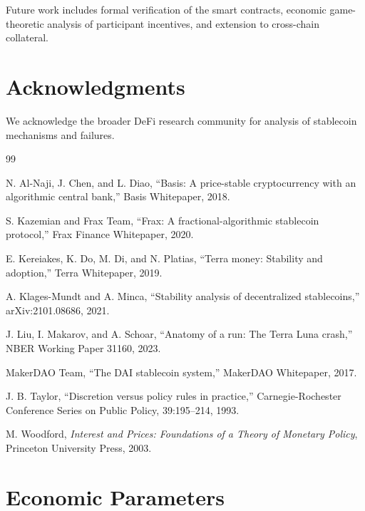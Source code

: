\documentclass[11pt,a4paper]{article}
\begin{document}
Future work includes formal verification of the smart contracts, economic game-theoretic analysis of participant incentives, and extension to cross-chain collateral.

\section*{Acknowledgments}

We acknowledge the broader DeFi research community for analysis of stablecoin mechanisms and failures.


\begin{thebibliography}{99}

N. Al-Naji, J. Chen, and L. Diao, ``Basis: A price-stable cryptocurrency with an algorithmic central bank,'' Basis Whitepaper, 2018.

S. Kazemian and Frax Team, ``Frax: A fractional-algorithmic stablecoin protocol,'' Frax Finance Whitepaper, 2020.

E. Kereiakes, K. Do, M. Di, and N. Platias, ``Terra money: Stability and adoption,'' Terra Whitepaper, 2019.

A. Klages-Mundt and A. Minca, ``Stability analysis of decentralized stablecoins,'' arXiv:2101.08686, 2021.

J. Liu, I. Makarov, and A. Schoar, ``Anatomy of a run: The Terra Luna crash,'' NBER Working Paper 31160, 2023.

MakerDAO Team, ``The DAI stablecoin system,'' MakerDAO Whitepaper, 2017.

J. B. Taylor, ``Discretion versus policy rules in practice,'' Carnegie-Rochester Conference Series on Public Policy, 39:195--214, 1993.

M. Woodford, \textit{Interest and Prices: Foundations of a Theory of Monetary Policy}, Princeton University Press, 2003.

\end{thebibliography}


\appendix

\section{Economic Parameters}
\end{document}
